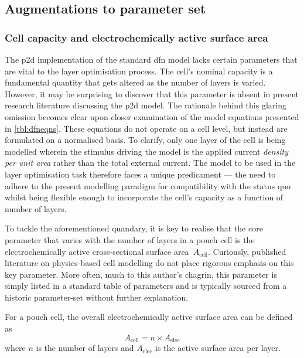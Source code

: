 
\subsection{Augmentations to parameter set}

\subsubsection*{Cell capacity and electrochemically active surface area}

The  \gls{p2d} implementation  of  the standard  \gls{dfn}  model lacks  certain
parameters that are vital to the  layer optimisation process. The cell's nominal
capacity is a fundamental quantity that gets  altered as the number of layers is
varied. However, it may be surprising  to discover that this parameter is absent
in present  research literature  discussing the  \gls{p2d} model.  The rationale
behind this glaring omission becomes clear  upon closer examination of the model
equations presented in  \cref{tbl:dfneqns}. These equations do not  operate on a
cell level, but  instead are formulated on a normalised  basis. To clarify, only
one layer of the  cell is being modelled wherein the  stimulus driving the model
is  the applied  current  \emph{density per  unit area}  rather  than the  total
external current. The model to be  used in the layer optimisation task therefore
faces  a unique  predicament ---  the need  to adhere  to the  present modelling
paradigm for compatibility  with the status quo whilst being  flexible enough to
incorporate the cell's capacity as a function of number of layers.

To  tackle  the  aforementioned  quandary,  it   is  key  to  realise  that  the
core  parameter  that  varies  with  the  number  of  layers  in  a  pouch  cell
is  the electrochemically  active cross-sectional  surface area~$A_\text{cell}$.
Curiously, published  literature on  physics-based cell  modelling do  not place
rigorous  emphasis on  this key  parameter. More  often, much  to this  author's
chagrin, this parameter  is simply listed in a standard  table of parameters and
is typically sourced from a historic parameter-set without further explanation.

For  a pouch  cell, the  overall electrochemically  active surface  area can  be
defined as
\begin{equation}\label{eq:overallarea}
    A_\text{cell} = n \times A_\text{elec}
\end{equation}
where $n$ is the number of layers and $A_\text{elec}$ is the active surface area
per layer.

